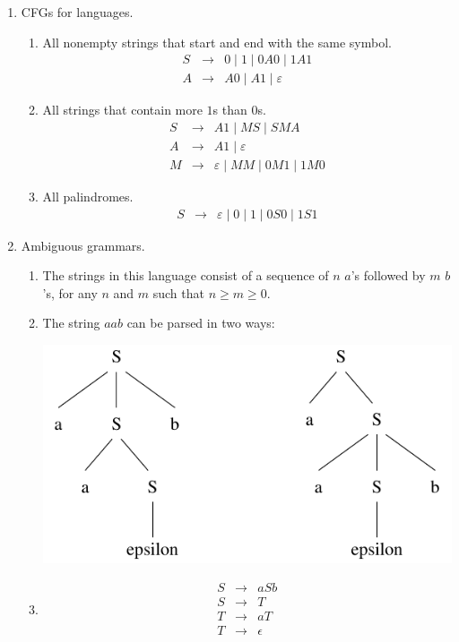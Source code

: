 \documentclass[11pt]{article}
\begin{document}

\begin{enumerate}
	
	\item CFGs for languages.
		\begin{enumerate}
			\item All nonempty strings that start and end with the same symbol.
				\begin{eqnarray*}
					S & \rightarrow & 0 \mid 1 \mid 0A0 \mid 1A1 \\
					A & \rightarrow & A0 \mid A1 \mid \varepsilon
				\end{eqnarray*}
			\item All strings that contain more $1$s than $0$s.
				\begin{eqnarray*}
					S & \rightarrow & A1 \mid MS \mid SMA \\
					A & \rightarrow & A1 \mid \varepsilon \\
					M & \rightarrow & \varepsilon \mid MM \mid 0M1 \mid 1M0
				\end{eqnarray*}
			\item All palindromes.
				\begin{eqnarray*}
					S & \rightarrow & \varepsilon \mid 0 \mid 1 \mid 0S0 \mid 1S1
				\end{eqnarray*}
		\end{enumerate}

	
	\item Ambiguous grammars.
		\begin{enumerate}
			\item The strings in this language consist of a sequence of $n$ $a$'s
				followed by $m$ $b$'s, for any $n$ and $m$ such that $n \geq m \geq 0$.
			\item The string $aab$ can be parsed in two ways:
				\begin{center}
					\includegraphics{aab}
				\end{center}
			\item
				\begin{eqnarray*}
					S & \rightarrow & aSb \\
					S & \rightarrow & T \\
					T & \rightarrow & aT \\
					T & \rightarrow & \epsilon \\
				\end{eqnarray*}
		\end{enumerate}
	

\end{enumerate}
\end{document}
